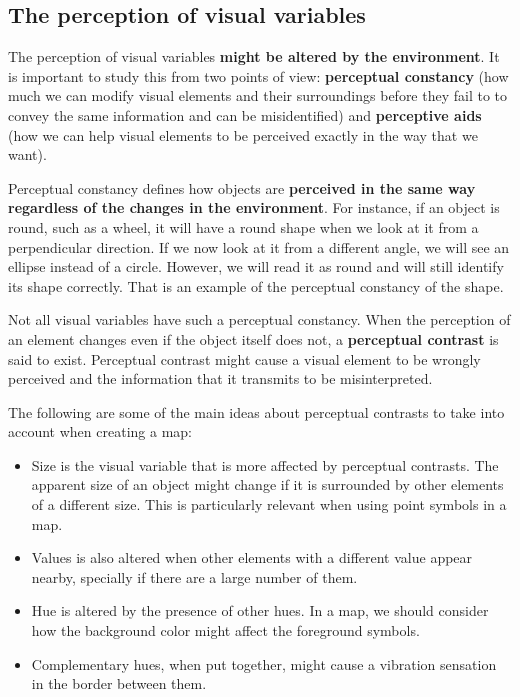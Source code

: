 \subsection{The perception of visual variables}

The perception of visual variables \textbf{might be altered by the environment}. It is important to study this from two points of view: \textbf{perceptual constancy} (how much we can modify visual elements and their surroundings before they fail to to convey the same information and can be misidentified) and \textbf{perceptive aids} (how we can help visual elements to be perceived exactly in the way that we want).

Perceptual constancy defines how objects are \textbf{perceived in the same way regardless of the changes in the environment}. For instance, if an object is round, such as a wheel, it will have a round shape when we look at it from a perpendicular direction. If we now look at it from a different angle, we will see an ellipse instead of a circle. However, we will read it as round and will still identify its shape correctly. That is an example of the perceptual constancy of the shape.

Not all visual variables have such a perceptual constancy. When the perception of an element changes even if the object itself does not, a \textbf{perceptual contrast} is said to exist. Perceptual contrast might cause a visual element to be wrongly perceived and the information that it transmits to be misinterpreted.

The following are some of the main ideas about perceptual contrasts to take into account when creating a map:

\begin{itemize}
	\item Size is the visual variable that is more affected by perceptual contrasts. The apparent size of an object might change if it is surrounded by other elements of a different size. This is particularly relevant when using point symbols in a map.	
	\item Values is also altered when other elements with a different value appear nearby, specially if there are a large number of them.
	\item Hue is altered by the presence of other hues. In a map, we should consider how the background color might affect the foreground symbols. 
	\item Complementary hues, when put together, might cause a vibration sensation in the border between them.
\end{itemize}

